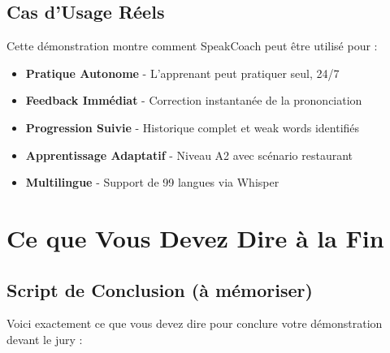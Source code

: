 \documentclass[12pt,a4paper,oneside]{report}
\begin{document}
\section{Cas d'Usage Réels}

Cette démonstration montre comment SpeakCoach peut être utilisé pour :

\begin{itemize}
    \item \textbf{Pratique Autonome} - L'apprenant peut pratiquer seul, 24/7
    \item \textbf{Feedback Immédiat} - Correction instantanée de la prononciation
    \item \textbf{Progression Suivie} - Historique complet et weak words identifiés
    \item \textbf{Apprentissage Adaptatif} - Niveau A2 avec scénario restaurant
    \item \textbf{Multilingue} - Support de 99 langues via Whisper
\end{itemize}

\newpage

\chapter{Ce que Vous Devez Dire à la Fin}

\section{Script de Conclusion (à mémoriser)}

Voici exactement ce que vous devez dire pour conclure votre démonstration devant le jury :
\end{document}
